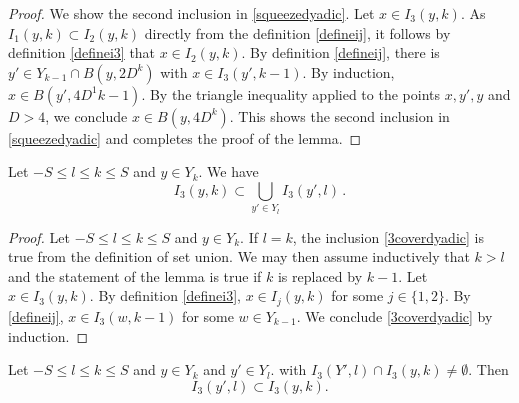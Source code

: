 \begin{proof}
We show the second inclusion in \eqref{squeezedyadic}.
Let $x\in I_3(y,k)$. As $I_1(y,k)\subset I_2(y,k)$
directly from the definition \eqref{defineij},
it follows by definition \eqref{definei3} that
$x\in I_2(y,k)$. By definition
\eqref{defineij}, there is $y'\in Y_{k-1}\cap B(y,2D^k)$
with $x\in I_3(y',k-1)$. By induction,
$x\in B(y', 4D^1{k-1})$. By the triangle inequality
applied to the points $x,y',y$ and $D>4$, we conclude
$x\in B(y,4D^k)$.
This shows the second inclusion in \eqref{squeezedyadic} and completes the proof of the lemma.
\end{proof}

\begin{lemma}\label{icoveri}
Let  $-S\le l\le k\le S$ and
$y\in Y_k$.
We have
\begin{equation}\label{3coverdyadic}
   I_3(y,k)\subset \bigcup_{y'\in Y_l} I_3(y',l)\, .
\end{equation}
\end{lemma}
\begin{proof}

Let $-S\le l\le k\le S$ and $y\in Y_k$.
If $l=k$, the inclusion \eqref{3coverdyadic}
is true from the definition of set union.
We may then assume inductively that $k>l$ and the statement of the lemma is true if $k$ is replaced by $k-1$.
Let $x\in I_3(y,k)$.
By definition \eqref{definei3},  $x\in I_j(y,k)$
for some $j\in \{1,2\}$. By \eqref{defineij},
$x\in I_3(w,k-1)$ for some $w\in Y_{k-1}$.
We conclude \eqref{3coverdyadic} by induction.
\end{proof}

\begin{lemma}\label{3dyadiclemma}
Let  $-S\le l\le k\le S$ and
$y\in Y_k$ and  $y'\in Y_l$.
with
$I_3(Y',l)\cap I_3(y,k)\neq \emptyset$.  Then
\begin{equation}
    \label{3dyadicproperty}
I_3(y',l)\subset I_3(y,k).
\end{equation}


\end{lemma}


